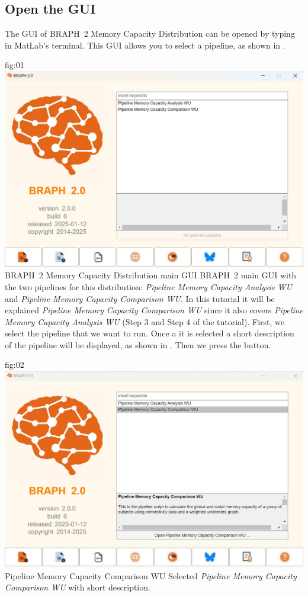 \documentclass[justified]{tufte-handout}
\begin{document}
\subsection{Open the GUI}

The GUI of BRAPH~2 Memory Capacity Distribution can be opened by typing  in MatLab's terminal. This GUI allows you to select a pipeline, as shown in .

{fig:01}
{
	\includegraphics{fig01.jpg}
}
{BRAPH~2 Memory Capacity Distribution main GUI}
{
	BRAPH~2 main GUI with the two pipelines for this distribution: \emph{Pipeline Memory Capacity Analysis WU} and \emph{Pipeline Memory Capacity Comparison WU}.
}
In this tutorial it will be explained \emph{Pipeline Memory Capacity Comparison WU} since it also covers \emph{Pipeline Memory Capacity Analysis WU} (Step 3 and Step 4 of the tutorial). First, we select the pipeline that we want to run. Once a it is selected a short description of the pipeline will be displayed, as shown in . Then we press the  button.

{fig:02}
{
	\includegraphics{fig02.jpg}
}
{Pipeline Memory Capacity Comparison WU}
{
	Selected \emph{Pipeline Memory Capacity Comparison WU} with short description.
}
\end{document}
